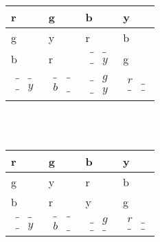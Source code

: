 \documentclass[a4paper]{article}
\begin{document}
\begin{tabular}{|l|l|l|l|}
\hline
r & g & b & y \\ \hline
g & y & r & b \\ \hline
b & r & $\begin{matrix}   \_ & \_ \\   \_ & y  \end{matrix}$ & g \\ \hline
$\begin{matrix}   \_ & \_ \\   \_ & y  \end{matrix}$ & $\begin{matrix}   \_ & \_ \\   b & \_  \end{matrix}$ & $\begin{matrix}   \_ & g \\   \_ & y  \end{matrix}$ & $\begin{matrix}   r & \_ \\   \_ & \_  \end{matrix}$ \\ \hline
\end{tabular}\\\\
\begin{tabular}{|l|l|l|l|}
\hline
r & g & b & y \\ \hline
g & y & r & b \\ \hline
b & r & y & g \\ \hline
$\begin{matrix}   \_ & \_ \\   \_ & y  \end{matrix}$ & $\begin{matrix}   \_ & \_ \\   b & \_  \end{matrix}$ & $\begin{matrix}   \_ & g \\   \_ & \_  \end{matrix}$ & $\begin{matrix}   r & \_ \\   \_ & \_  \end{matrix}$ \\ \hline
\end{tabular}\\\\
\end{document}
